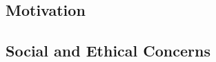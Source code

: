 \documentclass[english]{tktltiki2}
\theoremstyle{definition}
\theoremstyle{remark}
\begin{document}
\subsection{Motivation} %

\subsection{Social and Ethical Concerns} %
\end{document}
